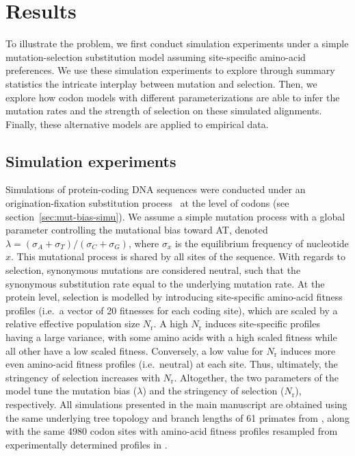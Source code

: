 \documentclass{article}
\newcommand{\Ner}{N_{\text{r}}}
\newcommand{\mutequi}{\sigma}
\begin{document}
\section{Results}
\label{sec:results}

To illustrate the problem, we first conduct simulation experiments under a simple mutation-selection {substitution} model assuming site-specific amino-acid preferences.
We use these simulation experiments to explore through summary statistics the intricate interplay between mutation and selection.
Then, we explore how codon models with different parameterizations are able to infer the mutation rates and the strength of selection on these simulated alignments.
Finally, these alternative models are applied to empirical data.

\subsection{Simulation experiments}
\label{subsec:simulations-experiments}

Simulations of protein-coding {DNA} sequences were conducted under an origination-fixation {substitution} process~\citep{McCandlish2014} at the level of codons (see section~\ref{sec:mut-bias-simu}).
We assume a simple mutation process with a global parameter controlling the mutational bias toward AT, denoted $\lambda = (\mutequi_A+\mutequi_T)/(\mutequi_C+\mutequi_G)$, where $\mutequi_x$ is the equilibrium frequency of nucleotide $x$.
This mutational process is shared by all sites of the sequence.
With regards to selection, {synonymous} mutations are considered {neutral}, such that the {synonymous} {substitution} rate equal to the underlying mutation rate.
At the protein level, selection is modelled by introducing site-specific amino-acid fitness profiles (i.e.~a vector of 20 fitnesses for each coding site), which are scaled by a relative effective population size $\Ner$.
A high $\Ner$ induces site-specific profiles having a large variance, with some amino acids with a high scaled fitness while all other have a low scaled fitness.
Conversely, a low value for $\Ner$ induces more even amino-acid fitness profiles (i.e.~neutral) at each site.
Thus, ultimately, the stringency of selection increases with $\Ner$.
Altogether, the two parameters of the model tune the mutation bias ($\lambda$) and the stringency of selection ($\Ner$), respectively.
All simulations presented in the main manuscript are obtained using the same underlying tree topology and branch lengths of 61 primates from \citet{Perelman2011}, along with the same 4980 codon sites with amino-acid fitness profiles resampled from experimentally determined profiles in \citet{Bloom2017}.
\end{document}
